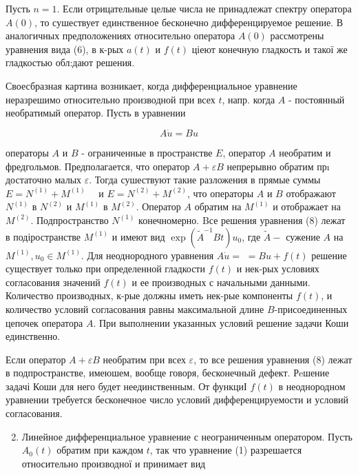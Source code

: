 \documentclass[10pt]{article}
\begin{document}
Пусть $n=1$. Если отрицательные целые числа не принадлежат спектру оператора $A(0)$, то сушествует единственное бесконечно дифференцируемое решение. В аналогичных предположениях относительно оператора $A(0)$ рассмотрены уравнения вида (6), в к-рых $a(t)$ и $f(t)$ ціеют конечную гладкость и такої же гладкостью обл:дают решения.



Своесбразная картина возникает, когда дифференциальное уравнение неразрешимо относительно производной при всех $t$, напр. когда $A$ - постоянный необратимый оператор. Пусть в уравнении



\[

A \dot{u}=B u

\]



операторы $A$ и $B$ - ограниченные в пространстве $E$, оператор $A$ необратим и фредгольмов. Предполагается, что оператор $A+\varepsilon B$ непрерывно обратим прı достаточно малых $\varepsilon$. Тогда сушествуют такие разложения в прямые суммы $E=N^{(1)}+M^{(1)} \quad$ и $E=N^{(2)}+M^{(2)}$, что операторы $A$ и $B$ отображают $N^{(1)}$ в $N^{(2)}$ и $M^{(1)}$ в $M^{(2)}$. Оператор $A$ обратим на $M^{(1)}$ и отображает на $M^{(2)}$. Подпространство $N^{(1)}$ конечномерно. Bсе решения уравнения (8) лежат в подіространстве $M^{(1)}$ и имеют вид $\exp \left(\tilde{A}^{-1} B t\right) u_{0}$, где $\tilde{A}-$ сужение $A$ на $M^{(1)}, u_{0} \in M^{(1)}$. Для неоднородного уравнения $A \dot{u}=$ $=B u+f(t)$ решение существует только при определенной гладкости $f(t)$ и нек-рых условиях согласования значений $f(t)$ и ее производных с начальными данными. Количество производных, к-рые должны иметь нек-рые компоненты $f(t)$, и количество условий согласования равны максимальной длине $B$-присоединенных цепочек оператора $A$. При выполнении указанных условий решение задачи Коши единственно.



Если оператор $A+\varepsilon B$ необратим при всех $\varepsilon$, то все решения уравнения (8) лежат в подпространстве, имеюшем, вообще говоря, бесконечный дефект. Рeшение задачі Коши для него будет неединственным. От функциІ $f(t)$ в неоднородном уравнении требуется бесконечное число условий дифференцируемости и условий согласования.



\begin{enumerate}

  \setcounter{enumi}{1}

  \item Линейное дифференциальное уравнение с неограниченным оператором. Пусть $A_{0}(t)$ обратим при каждом $t$, так что уравнение (1) разрешается относительно производної и принимает вид

\end{enumerate}
\end{document}
